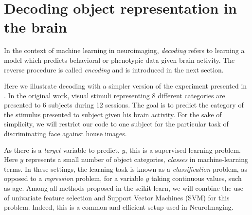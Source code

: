 \documentclass{frontiersSCNS} %
\begin{document}



\section{Decoding object representation in the brain}

In the context of machine learning in neuroimaging, \textit{decoding} refers to learning a model
which predicts behavioral or phenotypic data given brain activity. 
The reverse procedure is
called \textit{encoding} \citep{naselaris2011} and is introduced in the next 
section.

Here we illustrate decoding with a simpler version of the experiment presented in
\cite{haxby2001}. In the original work, visual stimuli representing 8 different categories
are presented to 6 subjects during 12 sessions. The goal is to 
predict the category of the stimulus presented to subject given his
brain activity. For the sake of simplicity, we will restrict our code 
to one subject for the
particular task of discriminating face against house images.

As there is a \emph{target} variable to predict, $y$, this is a supervised
learning problem. Here $y$ represents a small number of object categories,
\emph{classes} in machine-learning terms. In these settings, the learning
task is known as a \emph{classification} problem, as opposed to a
\emph{regression} problem, for a variable $y$ taking continuous values,
such as age.
Among all methods proposed in the scikit-learn, we will
combine the use of univariate feature selection and Support Vector
Machines (SVM) for this problem. Indeed, this is a common and efficient
setup used in NeuroImaging.
\end{document}
